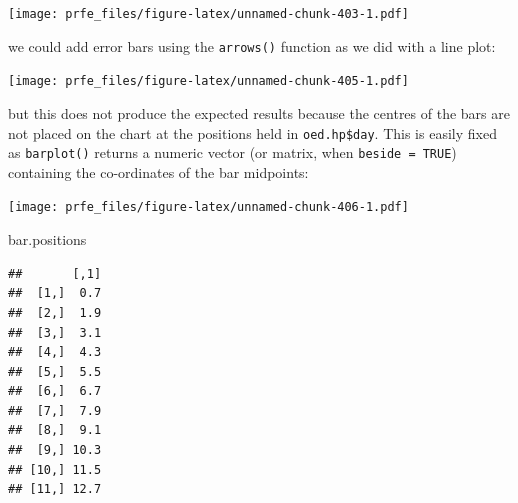 \documentclass[12pt,a4paper]{book}
\newenvironment{Shaded}{\begin{snugshade}}{\end{snugshade}}
\newcommand{\KeywordTok}[1]{\textcolor[rgb]{0.13,0.29,0.53}{\textbf{#1}}}
\newcommand{\DataTypeTok}[1]{\textcolor[rgb]{0.13,0.29,0.53}{#1}}
\newcommand{\DecValTok}[1]{\textcolor[rgb]{0.00,0.00,0.81}{#1}}
\newcommand{\FloatTok}[1]{\textcolor[rgb]{0.00,0.00,0.81}{#1}}
\newcommand{\StringTok}[1]{\textcolor[rgb]{0.31,0.60,0.02}{#1}}
\newcommand{\OperatorTok}[1]{\textcolor[rgb]{0.81,0.36,0.00}{\textbf{#1}}}
\newcommand{\NormalTok}[1]{#1}
\theoremstyle{definition}
\theoremstyle{definition}
\theoremstyle{definition}
\theoremstyle{remark}
\begin{document}
\texttt{[image: prfe\_files/figure-latex/unnamed-chunk-403-1.pdf]}

we could add error bars using the \texttt{arrows()} function as we did
with a line plot:

\begin{Shaded}
\end{Shaded}

\texttt{[image: prfe\_files/figure-latex/unnamed-chunk-405-1.pdf]}

but this does not produce the expected results because the centres of
the bars are not placed on the chart at the positions held in
\texttt{oed.hp\$day}. This is easily fixed as \texttt{barplot()} returns
a numeric vector (or matrix, when \texttt{beside\ =\ TRUE}) containing
the co-ordinates of the bar midpoints:

\begin{Shaded}
\end{Shaded}

\texttt{[image: prfe\_files/figure-latex/unnamed-chunk-406-1.pdf]}

\begin{Shaded}
\begin{Highlighting}[]
\NormalTok{bar.positions}
\end{Highlighting}
\end{Shaded}

\begin{verbatim}
##       [,1]
##  [1,]  0.7
##  [2,]  1.9
##  [3,]  3.1
##  [4,]  4.3
##  [5,]  5.5
##  [6,]  6.7
##  [7,]  7.9
##  [8,]  9.1
##  [9,] 10.3
## [10,] 11.5
## [11,] 12.7
\end{verbatim}
\end{document}
